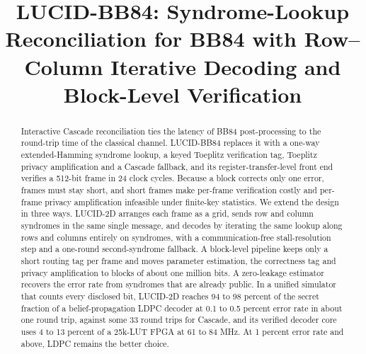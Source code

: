\documentclass[conference]{IEEEtran}
\begin{document}
\title{LUCID-BB84: Syndrome-Lookup Reconciliation for BB84 with Row--Column Iterative Decoding and Block-Level Verification}

\author{
\and
{}
\and
{}
}

\maketitle

\begin{abstract}
Interactive Cascade reconciliation ties the latency of BB84 post-processing to the round-trip time of the classical channel. LUCID-BB84 replaces it with a one-way extended-Hamming syndrome lookup, a keyed Toeplitz verification tag, Toeplitz privacy amplification and a Cascade fallback, and its register-transfer-level front end verifies a 512-bit frame in 24 clock cycles. Because a block corrects only one error, frames must stay short, and short frames make per-frame verification costly and per-frame privacy amplification infeasible under finite-key statistics. We extend the design in three ways. LUCID-2D arranges each frame as a grid, sends row and column syndromes in the same single message, and decodes by iterating the same lookup along rows and columns entirely on syndromes, with a communication-free stall-resolution step and a one-round second-syndrome fallback. A block-level pipeline keeps only a short routing tag per frame and moves parameter estimation, the correctness tag and privacy amplification to blocks of about one million bits. A zero-leakage estimator recovers the error rate from syndromes that are already public. In a unified simulator that counts every disclosed bit, LUCID-2D reaches 94 to 98 percent of the secret fraction of a belief-propagation LDPC decoder at 0.1 to 0.5 percent error rate in about one round trip, against some 33 round trips for Cascade, and its verified decoder core uses 4 to 13 percent of a 25k-LUT FPGA at 61 to 84 MHz. At 1 percent error rate and above, LDPC remains the better choice.
\end{abstract}
\end{document}

